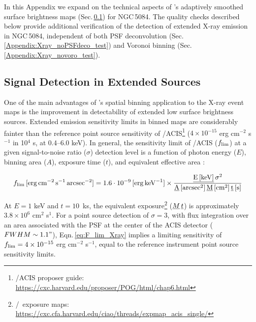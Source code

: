 \documentclass[modern]{CORE-AAS/aastex631}
\begin{document}
{In this Appendix we expand on the technical aspects of \SAUNAS's \citep{borlaff+2024apj967_169} adaptively smoothed surface brightness maps (Sec.\,\ref{Appendix:xray_SNR}) for NGC\,5084. The quality checks described below provide additional verification of the detection of  extended X-ray emission in NGC\,5084, independent of both PSF deconvolution (Sec.\,\ref{Appendix:Xray_noPSFdeco_test}) and Voronoi binning (Sec.\,\ref{Appendix:Xray_novoro_test}).

\subsection{Signal Detection in Extended Sources}
\label{Appendix:xray_SNR}

One of the main advantages of \SAUNAS's spatial binning application to the X-ray event maps is the improvement in detectability of extended low surface brightness sources. Extended emission sensitivity limits in binned maps are considerably fainter than the reference point source sensitivity of \Chandra/ACIS\footnote{\Chandra/ACIS proposer guide: \url{https://cxc.harvard.edu/proposer/POG/html/chap6.html}} ($4\times10^{-15}$ erg cm$^{-2}$ s$^{-1}$ in 10$^4$ s, at 0.4--6.0 keV). In general, the sensitivity limit of \Chandra/ACIS ($f_{\rm lim}$) at a given signal-to-noise ratio ($\sigma$) detection level is a function of photon energy ($E$), binning area ($A$), exposure time ($t$), and equivalent effective area \citep[$M$, which has a complex variation with energy, see Fig.\,6 in][]{evans+2010apj189_37}:

\begin{equation}
\label{eq:F_lim_Xray}
f_{\rm{lim}}\,[\rm{erg}\,\rm{cm}^{-2}\,\rm{s}^{-1}\,\rm{arcsec}^{-2} ] =\\ 1.6\cdot10^{-9}\,[\rm{erg} \, \rm{keV}^{-1}] \times\frac{\emph{E\,[\rm{keV}]}\,\sigma^2}{\emph{A}\,[arcsec^2]\,\emph{M}\,[cm^2]\,\emph{t}\,[s]}
\end{equation}

At $E=1$ keV and $t=10$~ks, the equivalent exposure\footnote{\ciao/\Chandra\ exposure maps: \url{https://cxc.cfa.harvard.edu/ciao/threads/expmap_acis_single/}} ($\emph{M}\,\emph{t}$) is approximately $3.8\times10^{6}$ cm$^{2}$ s$^{1}$. For a point source detection of $\sigma=3$, with flux integration over an area associated with the PSF at the center of the ACIS detector ($FWHM\sim1.1"$), Eqn.\,\ref{eq:F_lim_Xray} implies a limiting sensitivity of $f_{\rm{lim}} = 4\times10^{-15}$ erg cm$^{-2}$ s$^{-1}$, equal to the reference instrument point source sensitivity limits.

}
\end{document}
